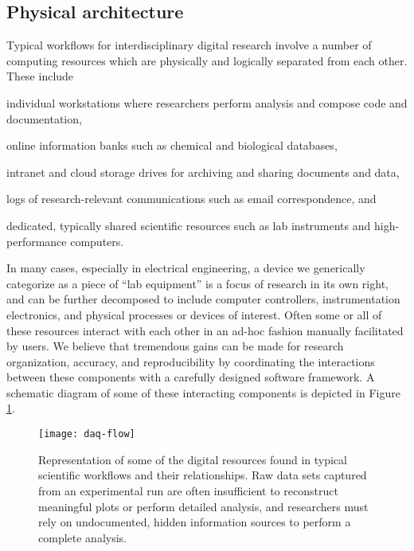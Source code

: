 \documentclass[../thesis]{subfiles}
\begin{document}
\subsection{Physical architecture}
Typical workflows for interdisciplinary digital research involve a
number of computing resources which are physically and logically
separated from each other. These include
\begin{enumerate*}[label=(\roman*)]
  \item{
      individual workstations where researchers perform analysis and
      compose code and documentation,
  }
  \item{
      online information banks such as chemical and biological
      databases,
  }
  \item{
      intranet and cloud storage drives for archiving and sharing
      documents and data,
  }
  \item{
      logs of research-relevant communications such as email
      correspondence, and
  }
  \item{
      dedicated, typically shared scientific resources such as lab
      instruments and high-performance computers.
  }
\end{enumerate*}
In many cases, especially in electrical engineering, a
device we generically categorize as a piece of ``lab equipment'' is a
focus of research in its own right, and can be further decomposed to
include computer controllers, instrumentation electronics, and
physical processes or devices of interest. Often some or all of these
resources interact with each other in an ad-hoc fashion manually
facilitated by users. We believe that tremendous gains can be made for
research organization, accuracy, and reproducibility by coordinating
the interactions between these components with a carefully designed
software framework. A schematic diagram of some of these interacting
components is depicted in Figure \ref{fig:DAQFlow}.

\begin{figure}
  \texttt{[image: daq-flow]}
  \caption[Research-relevant artifacts]{
    Representation of some of the digital resources found in
    typical scientific workflows and their relationships. Raw data sets
    captured from an experimental run are often insufficient to
    reconstruct meaningful plots or perform detailed analysis, and
    researchers must rely on undocumented, hidden information sources
    to perform a complete analysis.
    \label{fig:DAQFlow}
  }
\end{figure}
\end{document}
